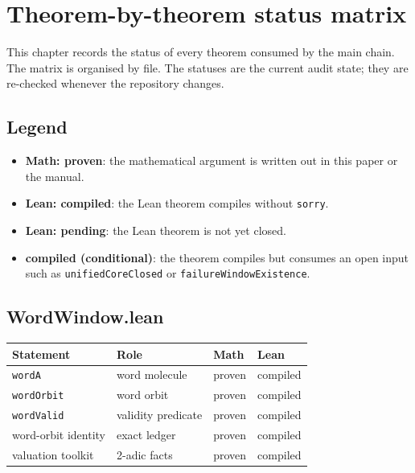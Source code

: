 \section{Theorem-by-theorem status matrix}

This chapter records the status of every theorem consumed by the main
chain.  The matrix is organised by file.  The statuses are the current
audit state; they are re-checked whenever the repository changes.

\begingroup
\setlength{\tabcolsep}{4pt}

\subsection{Legend}

\begin{itemize}[leftmargin=*]
\item \textbf{Math: proven}: the mathematical argument is written out
  in this paper or the manual.
\item \textbf{Lean: compiled}: the Lean theorem compiles without
  \texttt{sorry}.
\item \textbf{Lean: pending}: the Lean theorem is not yet closed.
\item \textbf{compiled (conditional)}: the theorem compiles but
  consumes an open input such as \texttt{unifiedCoreClosed} or
  \texttt{failureWindowExistence}.
\end{itemize}

\subsection{WordWindow.lean}

\begin{center}
\small
\begin{tabular}{@{}p{}p{}p{}p{}@{}}
\toprule
Statement & Role & Math & Lean \\
\midrule
\texttt{wordA} & word molecule & proven & compiled \\
\texttt{wordOrbit} & word orbit & proven & compiled \\
\texttt{wordValid} & validity predicate & proven & compiled \\
word-orbit identity & exact ledger & proven & compiled \\
valuation toolkit & 2-adic facts & proven & compiled \\
\bottomrule
\end{tabular}
\end{center}

